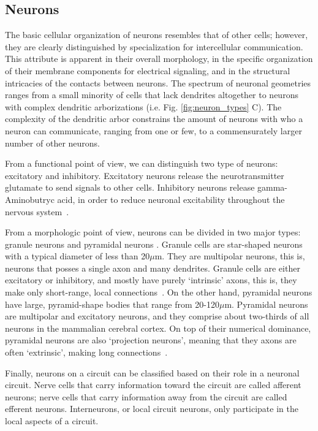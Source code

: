 \subsection{Neurons}
The basic cellular organization of neurons resembles that of other cells; however,
they are clearly distinguished by specialization for intercellular communication.
This attribute is apparent in their overall morphology, in the specific
organization of their membrane components for electrical signaling, and in the
structural intricacies of the contacts between neurons. The spectrum of neuronal
geometries ranges from a small minority of cells that lack dendrites altogether
to neurons with complex dendritic arborizations (i.e. Fig. \ref{fig:neuron_types} C).
The complexity of the dendritic arbor constrains the amount of neurons with who
a neuron can communicate, ranging from one or few, to a commensurately larger
number of other neurons.

From a functional point of view, we can distinguish two type of neurons:
excitatory and inhibitory. Excitatory neurons release the neurotransmitter
glutamate to send signals to other cells. Inhibitory neurons release
gamma-Aminobutryc acid, in order to reduce neuronal excitability throughout
the nervous system~\cite{Bekkers2011}.

From a morphologic point of view, neurons can be divided in two major types:
granule neurons and pyramidal neurons \cite{Purves2004}. Granule cells are 
star-shaped neurons with a typical diameter of less than 20$\mu$m. They are
multipolar neurons, this is, neurons that posses a single axon and many dendrites.
Granule cells are either excitatory or inhibitory, and mostly have purely
‘intrinsic’ axons, this is, they make only short-range, local connections~\cite{Purves2004}.
On the other hand, pyramidal neurons have large, pyramid-shape bodies that
range from 20-120$\mu$m. Pyramidal neurons are multipolar and excitatory neurons,
and they comprise about two-thirds of all neurons in the mammalian cerebral cortex.
On top of their numerical dominance, pyramidal neurons are also `projection neurons',
meaning that they axons are often `extrinsic', making long connections~\cite{Purves2004}.

Finally, neurons on a circuit can be classified based on their role in a 
neuronal circuit. Nerve cells that carry information toward the circuit are
called afferent neurons; nerve cells that carry information away from the 
circuit are called efferent neurons. Interneurons, or local circuit neurons,
only participate in the local aspects of a circuit.

